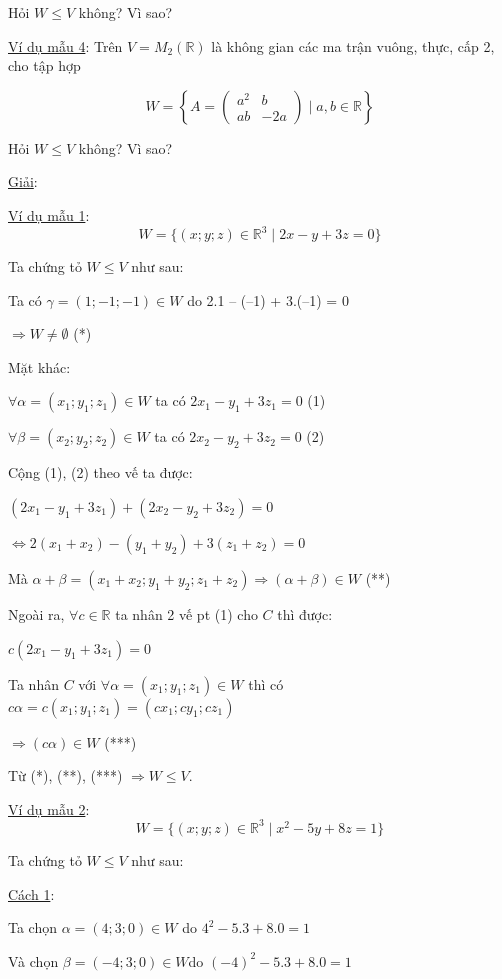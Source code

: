 \documentclass[12pt,a4paper]{article}
\begin{document}
Hỏi $W \le V$ không? Vì
sao?

\ul{Ví dụ mẫu 4}: Trên
$V = M_2(\mathbb{R})$ là không gian
các ma trận vuông, thực, cấp 2, cho tập hợp

\[ W = \left\{ A = \begin{pmatrix} a^2 & b \\ ab & -2a \end{pmatrix} \mid a, b \in \mathbb{R} \right\} \]

Hỏi $W \le V$ không? Vì
sao?

\ul{Giải}:

\ul{Ví dụ mẫu 1}:
\[ W = \{(x; y; z) \in \mathbb{R}^3 \mid 2x - y + 3z = 0\} \]

Ta chứng tỏ $W \le V$ như
sau:

Ta có $\gamma = (1; -1; -1) \in W$ do 2.1 --
(--1) + 3.(--1) = 0

$\Rightarrow W \neq \emptyset$ (*)

Mặt khác:

$\forall \alpha = (x_1; y_1; z_1) \in W$ ta có
$2x_1 - y_1 + 3z_1 = 0$ (1)

$\forall \beta = (x_2; y_2; z_2) \in W$ ta có
$2x_2 - y_2 + 3z_2 = 0$ (2)

Cộng (1), (2) theo vế ta được:

$(2x_1 - y_1 + 3z_1) + (2x_2 - y_2 + 3z_2) = 0$

$\Leftrightarrow 2(x_1 + x_2) - (y_1 + y_2) + 3(z_1 + z_2) = 0$

Mà $\alpha + \beta = (x_1 + x_2; y_1 + y_2; z_1 + z_2) \Rightarrow (\alpha + \beta) \in W$ (**)

Ngoài ra, $\forall c \in \mathbb{R}$ ta
nhân 2 vế pt (1) cho
$C$ thì được:

$c(2x_1 - y_1 + 3z_1) = 0$

Ta nhân $C$ với
$\forall \alpha = (x_1; y_1; z_1) \in W$ thì có
$c\alpha = c(x_1; y_1; z_1) = (cx_1; cy_1; cz_1)$

$\Rightarrow (c\alpha) \in W$ (***)

Từ (*), (**), (***)
$\Rightarrow W \le V$.

\ul{Ví dụ mẫu 2}:
\[ W = \{(x; y; z) \in \mathbb{R}^3 \mid x^2 - 5y + 8z = 1\} \]

Ta chứng tỏ $W \le V$ như
sau:

\ul{Cách 1}:

Ta chọn $\alpha = (4; 3; 0) \in W$ do
$4^2 - 5.3 + 8.0 = 1$

Và chọn $\beta = (-4; 3; 0) \in W$do
$(-4)^2 - 5.3 + 8.0 = 1$
\end{document}
